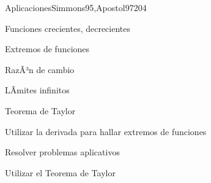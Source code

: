 \begin{syllabus}
\begin{unit}{Aplicaciones}{Simmons95,Apostol97}{20}{4}
   \begin{topics}
      \item Funciones crecientes, decrecientes
      \item Extremos de funciones
      \item RazÃ³n de cambio
      \item LÃ­mites infinitos
      \item Teorema de Taylor
   \end{topics}

   \begin{unitgoals}
      \item Utilizar la derivada para hallar extremos de funciones
      \item Resolver problemas aplicativos
      \item Utilizar el Teorema de Taylor
      \end{unitgoals}
\end{unit}



\begin{coursebibliography}
\end{coursebibliography}

\end{syllabus}
